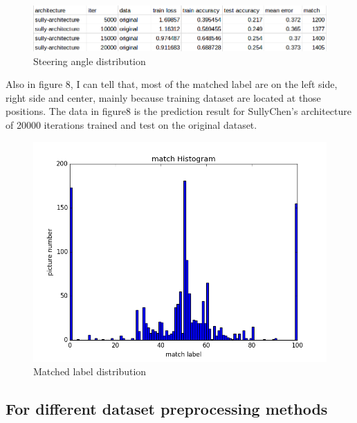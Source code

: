 \documentclass[10pt,twocolumn,letterpaper]{article}
\begin{document}
\begin{figure}[h]
	\begin{center}
		
		\includegraphics[width=0.8\linewidth]{overfit.png}
	\end{center}
	\caption{Steering angle distribution}
	\label{fig:long6}
	\label{fig:onecol6}
\end{figure}


Also in figure 8, I can tell that, most of the matched label are on the left side, right side and center, mainly because training dataset are located at those positions. The data in figure8 is the prediction result for SullyChen's architecture of 20000 iterations trained and test on the original dataset.

\begin{figure}[h]
	\begin{center}
		
		\includegraphics[width=0.8\linewidth]{mh9.png}
	\end{center}
	\caption{Matched label distribution}
	\label{fig:long8}
	\label{fig:onecol8}
\end{figure}


\subsection{For different dataset preprocessing methods}



{\small


}
\end{document}
